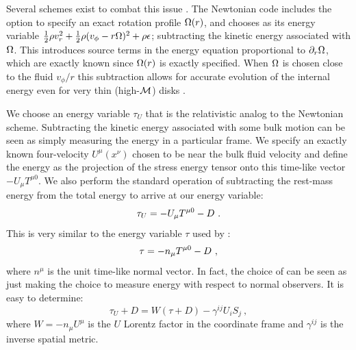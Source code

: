 Several schemes exist to combat this issue \citep{Masset00}. The Newtonian \Disco{} code includes the option to specify an exact rotation profile $\Omega(r)$, and chooses as its energy variable $\frac{1}{2}\rho v_r^2 + \frac{1}{2}\rho(v_\phi-r\Omega)^2 + \rho \epsilon$; subtracting the kinetic energy associated with $\Omega$. This introduces source terms in the energy equation proportional to $\partial_r \Omega$, which are exactly known since $\Omega(r)$ is exactly specified.  When $\Omega$ is chosen close to the fluid $v_\phi / r$ this subtraction allows for accurate evolution of the internal energy even for very thin (high-$\mathcal{M}$) disks \citep{Duffell16}.

We choose an energy variable $\tau_U$ that is the relativistic analog to the Newtonian scheme.  Subtracting the kinetic energy associated with some bulk motion can be seen as simply measuring the energy in a particular frame. We specify an exactly known four-velocity $U^\mu(x^\nu)$ chosen to be near the bulk fluid velocity and define the energy as the projection of the stress energy tensor onto this time-like vector $-U_\mu T^{\mu 0}$.  We also perform the standard operation of subtracting the rest-mass energy from the total energy to arrive at our energy variable:
\begin{equation}
	\tau_U = -U_\mu T^{\mu 0} - D \ . \eqlabel{tauU}
\end{equation}
This is very similar to the energy variable $\tau$ used by \citep{HARM, Duez05}:
\begin{equation}
	\tau = -n_\mu T^{\mu 0} - D \ , \eqlabel{tau}
\end{equation}
where $n^\mu$ is the unit time-like normal vector. In fact, the choice of  can be seen as just making the choice to measure energy with respect to normal observers.  It is easy to determine: %
\begin{equation}
\tau_U + D = W\left(\tau + D\right) - \gamma^{ij}U_i S_j  \ ,
\end{equation}
where $W = -n_\mu U^\mu$ is the $U$ Lorentz factor in the coordinate frame and $\gamma^{ij}$ is the inverse spatial metric.

